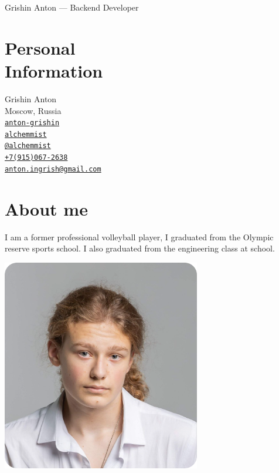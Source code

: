 \documentclass[margin,line]{resume}
\begin{document}
{\sc \Large Grishin Anton --- Backend Developer \\}

\begin{resume}
  \begin{minipage}[H]{0.52\textwidth}
    \section{\mysidestyle Personal\\Information}
    Grishin Anton \\
    Moscow, Russia \\
    \faLinkedin \space
    \href{https://www.linkedin.com/in/anton-grishin-6966a8362/}{\texttt{anton-grishin}}
    \\
    \faGithub  \space \href{https://github.com/alchemmist/}{\texttt{alchemmist}} \\
    \faPaperPlane \space \href{https://t.me/alchemmist}{\texttt{@alchemmist}} \\
    \faPhone \space \href{tel:+1234567890}{\color{blue}\texttt{+7(915)067-2638}}  \\
    \faEnvelope \space \href{mailto:anton.ingrish@gmail.com}{\color{blue}\texttt{anton.ingrish@gmail.com}}
  \end{minipage}
  \begin{minipage}[H]{0.28\textwidth}
    \section{\mysidestyle About me }
    I am a former professional volleyball player, I graduated from the
    Olympic reserve sports school. I also graduated from the
    engineering class at school. \\
  \end{minipage}%
  \begin{minipage}[H]{0.25\textwidth}
      \hspace{5mm}
      \includegraphics[width=0.65\textwidth]{avatar.png}
      \\
  \end{minipage}


\end{resume}
\end{document}
